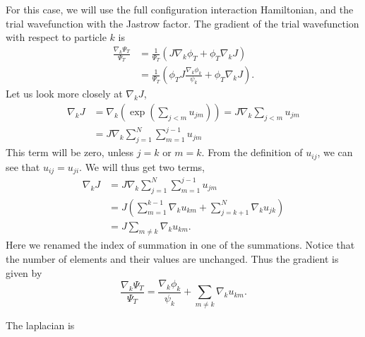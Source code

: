 \documentclass[aps,reprint,superscriptaddress,nofootinbib]{revtex4-2}
\begin{document}
    For this case, we will use the full configuration interaction Hamiltonian, and the trial wavefunction with the Jastrow factor. The gradient of the trial wavefunction with respect to particle \(k\) is
    \begin{align*}
        \frac{\nabla_k \Psi_T}{\Psi_T} &= \frac{1}{\Psi_T} (J \nabla_k \phi_T + \phi_T \nabla_k J) \\
        &= \frac{1}{\Psi_T} \left( \phi_T J \frac{\nabla_k \phi_k}{\psi_k} + \phi_T \nabla_k J \right).
    \end{align*}
    Let us look more closely at \(\nabla_k J\),
    \begin{align*}
        \nabla_k J &= \nabla_k \left( \exp \left( \sum_{j < m} u_{jm} \right) \right) = J \nabla_k \sum_{j < m} u_{jm} \\
        &= J \nabla_k \sum_{j=1}^N \sum_{m=1}^{j-1} u_{jm}
    \end{align*}
    This term will be zero, unless \(j=k\) or \(m=k\). From the definition of \(u_{ij}\), we can see that \(u_{ij} = u_{ji}\). We will thus get two terms,
    \begin{align*}
        \nabla_k J &= J \nabla_k \sum_{j=1}^N \sum_{m=1}^{j-1} u_{jm} \\
        &= J \left( \sum_{m = 1}^{k-1} \nabla_k u_{km} + \sum_{j = k+1}^N \nabla_k u_{jk} \right) \\
        &= J \sum_{m \neq k} \nabla_k u_{km}.
    \end{align*}
    Here we renamed the index of summation in one of the summations. Notice that the number of elements and their values are unchanged. Thus the gradient is given by
    \begin{equation*}
        \frac{\nabla_k \Psi_T}{\Psi_T} = \frac{\nabla_k \phi_k}{\psi_k} + \sum_{m \neq k} \nabla_k u_{km}.
    \end{equation*}
    
    The laplacian is \\
    
\end{document}
